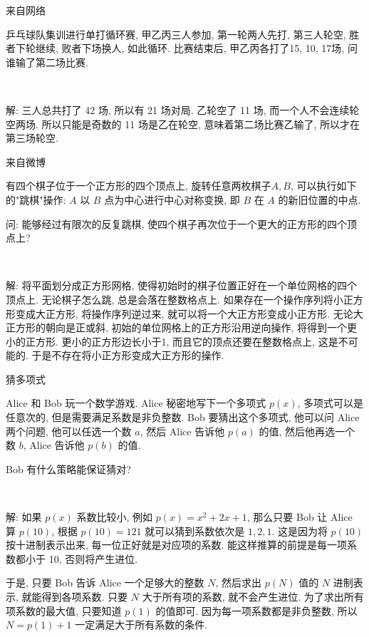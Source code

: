 \newpage
\noindent 来自网络

乒乓球队集训进行单打循环赛, 甲乙丙三人参加, 第一轮两人先打, 第三人轮空, 胜者下轮继续, 败者下场换人, 如此循环. 比赛结束后, 甲乙丙各打了15, 10, 17场, 问谁输了第二场比赛.

~

解: 三人总共打了 42 场, 所以有 21 场对局. 乙轮空了 11 场, 而一个人不会连续轮空两场. 所以只能是奇数的 11 场是乙在轮空, 意味着第二场比赛乙输了, 所以才在第三场轮空.



\newpage
\noindent 来自微博

有四个棋子位于一个正方形的四个顶点上, 旋转任意两枚棋子$A,B$, 可以执行如下的"跳棋"操作: $A$ 以 $B$ 点为中心进行中心对称变换, 即 $B$ 在 $A$ 的新旧位置的中点.

问: 能够经过有限次的反复跳棋, 使四个棋子再次位于一个更大的正方形的四个顶点上?

~

解: 将平面划分成正方形网格, 使得初始时的棋子位置正好在一个单位网格的四个顶点上. 无论棋子怎么跳, 总是会落在整数格点上. 如果存在一个操作序列将小正方形变成大正方形, 将操作序列逆过来, 就可以将一个大正方形变成小正方形. 无论大正方形的朝向是正或斜, 初始的单位网格上的正方形沿用逆向操作, 将得到一个更小的正方形. 更小的正方形边长小于1, 而且它的顶点还要在整数格点上, 这是不可能的. 于是不存在将小正方形变成大正方形的操作.


\newpage

\noindent 猜多项式

Alice 和 Bob 玩一个数学游戏. Alice 秘密地写下一个多项式 $p(x)$, 多项式可以是任意次的, 但是需要满足系数是非负整数. Bob 要猜出这个多项式, 他可以问 Alice 两个问题, 他可以任选一个数 $a$, 然后 Alice 告诉他 $p(a)$ 的值, 然后他再选一个数 $b$, Alice 告诉他 $p(b)$ 的值. 

Bob 有什么策略能保证猜对?

~

解: 如果 $p(x)$ 系数比较小, 例如 $p(x) = x^2 + 2x + 1$, 那么只要 Bob 让 Alice 算 $p(10)$, 根据 $p(10) = 121$ 就可以猜到系数依次是 $1,2,1$. 这是因为将 $p(10)$ 按十进制表示出来, 每一位正好就是对应项的系数. 能这样推算的前提是每一项系数都小于 10, 否则将产生进位. 

于是, 只要 Bob 告诉 Alice 一个足够大的整数 $N$, 然后求出 $p(N)$ 值的 $N$ 进制表示, 就能得到各项系数. 只要 $N$ 大于所有项的系数, 就不会产生进位. 为了求出所有项系数的最大值, 只要知道 $p(1)$ 的值即可. 因为每一项系数都是非负整数, 所以 $N = p(1) + 1$ 一定满足大于所有系数的条件.

